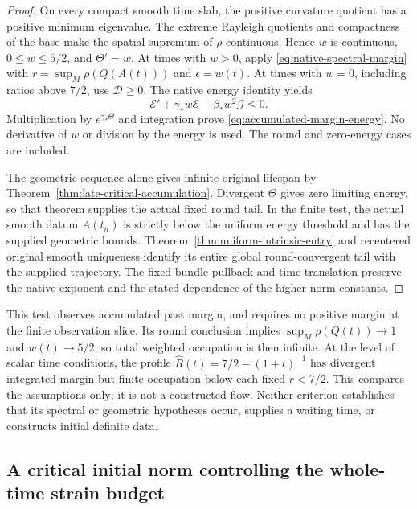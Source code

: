 \documentclass[11pt]{article}
\numberwithin{equation}{section}
\theoremstyle{definition}
\theoremstyle{remark}
\begin{document}
\begin{proof}
On every compact smooth time slab, the positive curvature
quotient has a positive minimum eigenvalue. The extreme
Rayleigh quotients and compactness of the base make the
spatial supremum of $\rho$ continuous. Hence $w$ is
continuous, $0\le w\le5/2$, and $\Theta'=w$.
At times with $w>0$, apply
\eqref{eq:native-spectral-margin} with
$r=\sup_M\rho(Q(A(t)))$ and $\epsilon=w(t)$.
At times with $w=0$, including ratios above $7/2$, use
$\mathscr D\ge0$. The native energy identity yields
\[
 \mathscr E'+\gamma_*w\mathscr E+\beta_*w^2\mathscr G\le0.
\]
Multiplication by $e^{\gamma_*\Theta}$ and integration
prove \eqref{eq:accumulated-margin-energy}. No derivative
of $w$ or division by the energy is used. The round and
zero-energy cases are included.

The geometric sequence alone gives infinite original
lifespan by Theorem~\ref{thm:late-critical-accumulation}.
Divergent $\Theta$ gives zero limiting energy, so that
theorem supplies the actual fixed round tail. In the
finite test, the actual smooth datum $A(t_n)$ is strictly
below the uniform energy threshold and has the supplied
geometric bounds. Theorem~\ref{thm:uniform-intrinsic-entry}
and recentered original smooth uniqueness identify its
entire global round-convergent tail with the supplied
trajectory. The fixed bundle pullback and time translation
preserve the native exponent and the stated dependence of
the higher-norm constants.
\end{proof}

This test observes accumulated past margin, and requires no
positive margin at the finite observation slice. Its round
conclusion implies $\sup_M\rho(Q(t))\to1$ and $w(t)\to5/2$,
so total weighted occupation is then infinite. At the level
of scalar time conditions, the profile
$\widehat R(t)=7/2-(1+t)^{-1}$ has divergent integrated margin
but finite occupation below each fixed $r<7/2$. This compares
the assumptions only; it is not a constructed flow. Neither
criterion establishes that its spectral or geometric
hypotheses occur, supplies a waiting time, or constructs
initial definite data.


\subsection{A critical initial norm controlling the whole-time strain budget}
\label{subsec:critical-budget}
\end{document}
